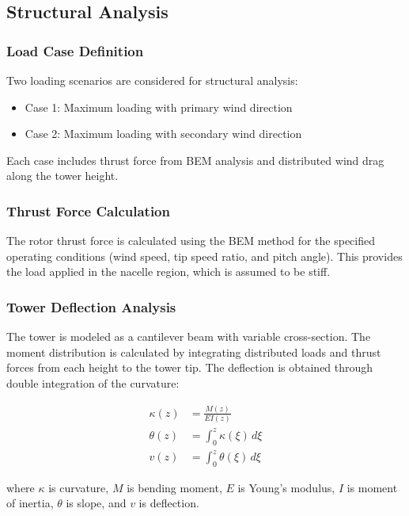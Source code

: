 \documentclass[11pt]{article}
\begin{document}
\subsection{Structural Analysis}

\subsubsection{Load Case Definition}

Two loading scenarios are considered for structural analysis:
\begin{itemize}
    \item Case 1: Maximum loading with primary wind direction
    \item Case 2: Maximum loading with secondary wind direction
\end{itemize}

Each case includes thrust force from BEM analysis and distributed wind drag along the tower height.

\subsubsection{Thrust Force Calculation}

The rotor thrust force is calculated using the BEM method for the specified operating conditions (wind speed, tip speed ratio, and pitch angle). This provides the load applied in the nacelle region, which is assumed to be stiff.

\subsubsection{Tower Deflection Analysis}

The tower is modeled as a cantilever beam with variable cross-section. The moment distribution is calculated by integrating distributed loads and thrust forces from each height to the tower tip. The deflection is obtained through double integration of the curvature:

\begin{align}
\kappa(z) &= \frac{M(z)}{EI(z)} \\
\theta(z) &= \int_0^z \kappa(\xi) \, d\xi \\
v(z) &= \int_0^z \theta(\xi) \, d\xi
\end{align}

where $\kappa$ is curvature, $M$ is bending moment, $E$ is Young's modulus, $I$ is moment of inertia, $\theta$ is slope, and $v$ is deflection.
\end{document}
